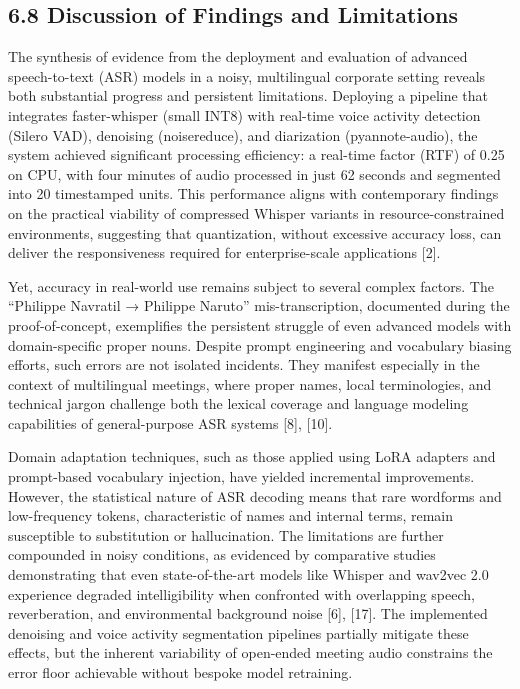 \documentclass[12pt,a4paper]{article}
\begin{document}
\subsection{6.8 Discussion of Findings and Limitations}


The synthesis of evidence from the deployment and evaluation of advanced speech-to-text (ASR) models in a noisy, multilingual corporate setting reveals both substantial progress and persistent limitations. Deploying a pipeline that integrates faster-whisper (small INT8) with real-time voice activity detection (Silero VAD), denoising (noisereduce), and diarization (pyannote-audio), the system achieved significant processing efficiency: a real-time factor (RTF) of 0.25 on CPU, with four minutes of audio processed in just 62 seconds and segmented into 20 timestamped units. This performance aligns with contemporary findings on the practical viability of compressed Whisper variants in resource-constrained environments, suggesting that quantization, without excessive accuracy loss, can deliver the responsiveness required for enterprise-scale applications [2].


Yet, accuracy in real-world use remains subject to several complex factors. The “Philippe Navratil → Philippe Naruto” mis-transcription, documented during the proof-of-concept, exemplifies the persistent struggle of even advanced models with domain-specific proper nouns. Despite prompt engineering and vocabulary biasing efforts, such errors are not isolated incidents. They manifest especially in the context of multilingual meetings, where proper names, local terminologies, and technical jargon challenge both the lexical coverage and language modeling capabilities of general-purpose ASR systems [8], [10].


Domain adaptation techniques, such as those applied using LoRA adapters and prompt-based vocabulary injection, have yielded incremental improvements. However, the statistical nature of ASR decoding means that rare wordforms and low-frequency tokens, characteristic of names and internal terms, remain susceptible to substitution or hallucination. The limitations are further compounded in noisy conditions, as evidenced by comparative studies demonstrating that even state-of-the-art models like Whisper and wav2vec 2.0 experience degraded intelligibility when confronted with overlapping speech, reverberation, and environmental background noise [6], [17]. The implemented denoising and voice activity segmentation pipelines partially mitigate these effects, but the inherent variability of open-ended meeting audio constrains the error floor achievable without bespoke model retraining.
\end{document}
